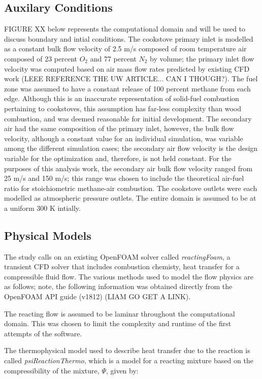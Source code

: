 \documentclass[3p,times,twocolumn]{elsarticle}
\begin{document}
\subsection{Auxilary Conditions}
FIGURE XX below represents the computational domain and will be used to discuss boundary and intial conditions. The cookstove primary inlet is modelled as a constant bulk flow velocity of 2.5 m/s composed of room temperature air composed of 23 percent $O_{2}$ and 77 percent $N_{2}$ by volume; the primary inlet flow velocity was computed based on air mass flow rates predicted by existing CFD work (LEEE REFERENCE THE UW ARTICLE... CAN I THOUGH?). The fuel zone was assumed to have a constant release of 100 percent methane from each edge. Although this is an inaccurate representation of solid-fuel combustion pertaining to cookstoves, this assumption has far-less complexity than wood combustion, and was deemed reasonable for initial development. The secondary air had the same composition of the primary inlet, however, the bulk flow velocity, although a constant value for an individual simulation, was variable among the different simulation cases; the secondary air flow velocity is the design variable for the optimization and, therefore, is not held constant. For the purposes of this analysis work, the secondary air bulk flow velocity ranged from 25 m/s and 150 m/s; this range was chosen to include the theoretical air-fuel ratio for stoichiometric methane-air combustion. The cookstove outlets were each modelled as atmospheric pressure outlets. The entire domain is assumed to be at a uniform 300 K intially. 


\subsection{Physical Models}
The study calls on an existing OpenFOAM solver called \textit{reactingFoam}, a transient CFD solver that includes combustion chemisty, heat transfer for a compressible fluid flow. The various methods used to model the flow physics are as follows; note, the following information was obtained directly from the OpenFOAM API guide (v1812) (LIAM GO GET A LINK).


The reacting flow is assumed to be laminar throughout the computational domain. This was chosen to limit the complexity and runtime of the first attempts of the software.

The thermophysical model used to describe heat transfer due to the reaction is called \textit{psiReactionThermo}, which is a model for a reacting mixture based on the compressibility of the mixture, $\Psi$, given by:
\end{document}
